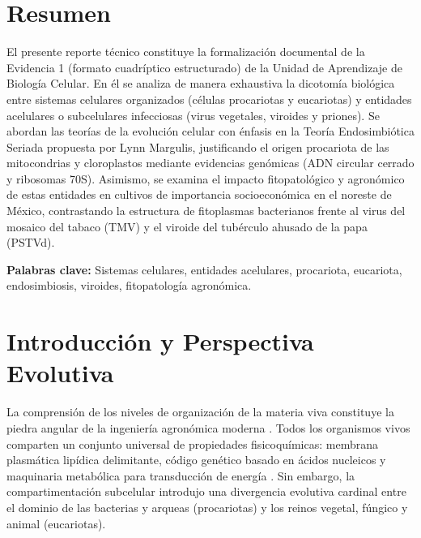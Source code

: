 \documentclass[12pt,spanish,letterpaper,oneside]{article}
\begin{document}
\hypersetup{pageanchor=false}
\begingroup
\fontsize{14}{17}\selectfont
\renewcommand{\Huge}{\fontsize{14}{17}\selectfont\bfseries}
\renewcommand{\large}{\fontsize{14}{17}\selectfont}
\templatePortrait
\clearpage
\endgroup
\hypersetup{pageanchor=true}
\templatePagecfg
\singlespacing
\setlength{\tabcolsep}{8pt}
\renewcommand{\arraystretch}{1.18}

\section*{Resumen}
El presente reporte técnico constituye la formalización documental de la Evidencia 1 (formato cuadríptico estructurado) de la Unidad de Aprendizaje de Biología Celular. En él se analiza de manera exhaustiva la dicotomía biológica entre sistemas celulares organizados (células procariotas y eucariotas) y entidades acelulares o subcelulares infecciosas (virus vegetales, viroides y priones). Se abordan las teorías de la evolución celular con énfasis en la Teoría Endosimbiótica Seriada propuesta por Lynn Margulis, justificando el origen procariota de las mitocondrias y cloroplastos mediante evidencias genómicas (ADN circular cerrado y ribosomas 70S). Asimismo, se examina el impacto fitopatológico y agronómico de estas entidades en cultivos de importancia socioeconómica en el noreste de México, contrastando la estructura de fitoplasmas bacterianos frente al virus del mosaico del tabaco (TMV) y el viroide del tubérculo ahusado de la papa (PSTVd).

\vspace{0.4cm}
\noindent\textbf{Palabras clave:} Sistemas celulares, entidades acelulares, procariota, eucariota, endosimbiosis, viroides, fitopatología agronómica.

\section{Introducción y Perspectiva Evolutiva}
La comprensión de los niveles de organización de la materia viva constituye la piedra angular de la ingeniería agronómica moderna \parencite{alberts2015}. Todos los organismos vivos comparten un conjunto universal de propiedades fisicoquímicas: membrana plasmática lipídica delimitante, código genético basado en ácidos nucleicos y maquinaria metabólica para transducción de energía \parencite{lodish2016}. Sin embargo, la compartimentación subcelular introdujo una divergencia evolutiva cardinal entre el dominio de las bacterias y arqueas (procariotas) y los reinos vegetal, fúngico y animal (eucariotas).
\end{document}
